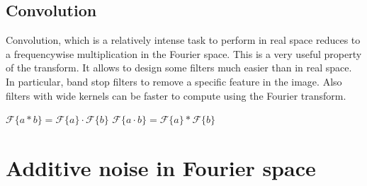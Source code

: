 \documentclass[letterpaper,10pt,english]{sphinxmanual}
\begin{document}
\begin{sphinxVerbatim}[commandchars=\\\{\}]
 
\end{sphinxVerbatim}

\noindent{}


\subsection{Convolution}
\label{\detokenize{02-ImageEnhancement:convolution}}
\sphinxAtStartPar
Convolution, which is a relatively intense task to perform in real space reduces to a frequency\sphinxhyphen{}wise multiplication in the Fourier space. This is a very useful property of the transform. It allows to design some filters much easier than in real space. In particular, band stop filters to remove a specific feature in the image. Also filters with wide kernels can be faster to compute using the Fourier transform.

\sphinxAtStartPar
\(\mathcal{F}\{a * b\} = \mathcal{F}\{a\} \cdot \mathcal{F}\{b\} \)
\(\mathcal{F}\{a \cdot b\} = \mathcal{F}\{a\} * \mathcal{F}\{b\} \)


\section{Additive noise in Fourier space}
\label{\detokenize{02-ImageEnhancement:additive-noise-in-fourier-space}}
\end{document}

